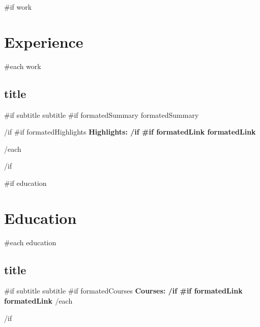 \documentclass{article}
\begin{document}
{{#if work}}
\section*{Experience} {
  {{#each work}}
    \subsection*{ {{ title }} } {
      {{#if subtitle}}{{ subtitle }} \ignorespaces
      {{#if formatedSummary}}
        {{ formatedSummary }} 
        \par
      {{/if}}\ignorespaces
      {{#if formatedHighlights}}
        \bfseries Highlights: \newline
      {{/if}}\ignorespaces
      {{#if formatedLink}}{{ formatedLink }}\ignorespaces
    }
  {{/each}}
}
{{/if}}\ignorespaces

{{#if education}}\section*{Education}{
  {{#each education}}
    \subsection*{ {{ title }} } {
      {{#if subtitle}}{{ subtitle }} \ignorespaces
      {{#if formatedCourses}}
        \bfseries Courses: \newline
      {{/if}}\ignorespaces
      {{#if formatedLink}}{{ formatedLink }}\ignorespaces
    }
  {{/each}}
}{{/if}}\ignorespaces
\end{document}
